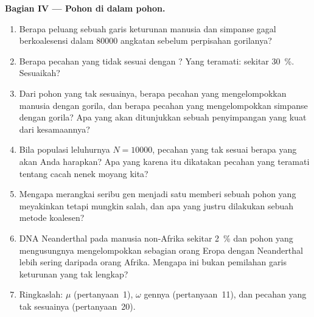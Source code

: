 \begin{problem}
\medskip
\noindent\textbf{Bagian IV --- Pohon di dalam pohon.}
\begin{enumerate}[resume]
  \item Berapa peluang sebuah garis keturunan manusia dan simpanse gagal
        berkoalesensi dalam \num{80000} angkatan sebelum perpisahan gorilanya?
  \item Berapa pecahan  yang tidak sesuai dengan ?
        Yang teramati: sekitar \qty{30}{\%}. Sesuaikah?
  \item Dari pohon yang tak sesuainya, berapa pecahan yang mengelompokkan manusia dengan
        gorila, dan berapa pecahan yang mengelompokkan simpanse dengan gorila? Apa yang akan ditunjukkan sebuah
        penyimpangan yang kuat dari kesamaannya?
  \item Bila populasi leluhurnya $N = \num{10000}$, pecahan yang tak
        sesuai berapa yang akan Anda harapkan? Apa yang karena itu dikatakan pecahan yang teramati
        tentang cacah nenek moyang kita?
  \item Mengapa merangkai seribu gen menjadi satu  memberi
        sebuah pohon yang meyakinkan tetapi mungkin salah, dan apa yang justru dilakukan sebuah
        metode koalesen?
  \item DNA Neanderthal pada manusia non-Afrika sekitar \qty{2}{\%} dan
        pohon yang mengusungnya mengelompokkan sebagian orang Eropa dengan Neanderthal lebih
        sering daripada orang Afrika. Mengapa ini bukan pemilahan garis keturunan yang tak lengkap?
  \item Ringkaslah: $\mu$ (pertanyaan~1), $\omega$ gennya
        (pertanyaan~11), dan pecahan yang tak sesuainya (pertanyaan~20).
\end{enumerate}
\end{problem}
